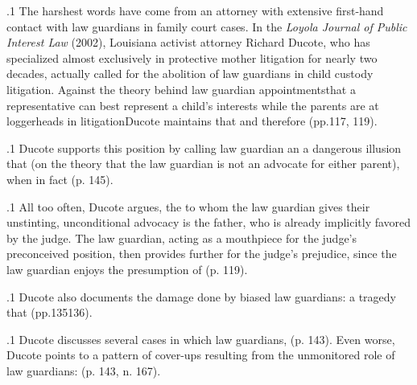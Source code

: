 \documentclass[11pt, twoside]{article}
\begin{document}
{\p.1{%
The harshest words have come from an attorney with extensive
first-hand contact with law guardians in family court cases. In the \textit{Loyola
Journal of Public Interest Law} (2002), Louisiana activist attorney Richard
Ducote, who has specialized almost exclusively in protective mother
litigation for nearly two decades, actually called for the abolition of
law guardians in child custody litigation. Against the theory behind
law guardian appointments\mdash{}that a  representative can best
represent a child’s interests while the parents are at loggerheads in
litigation\mdash{}Ducote maintains that  and therefore  (pp.\@ 117, 119).
}%

\p.1{%
Ducote supports this position by calling law guardian 
an  a dangerous illusion that  (on the theory that the law guardian is not
an advocate for either parent), when in fact  (p. 145).
}%

\p.1{%
All too often, Ducote argues, the  to whom the law
guardian gives their unstinting, unconditional advocacy is the father,
who is already implicitly favored by the judge. The law guardian, acting
as a mouthpiece for the judge’s preconceived position, then provides
further  for the judge’s prejudice, since the law guardian enjoys
the presumption of  (p. 119).
}%

\p.1{%
Ducote also documents the damage done by biased law guardians:
 a tragedy that  (pp.\@ 135\ndash{}136).
}%

\p.1{%
Ducote discusses several cases in which law guardians,  (p. 143). Even worse, Ducote points
to a pattern of cover-ups resulting from the unmonitored role of law
guardians:  (p. 143,
n. 167).
}%

}
\end{document}
